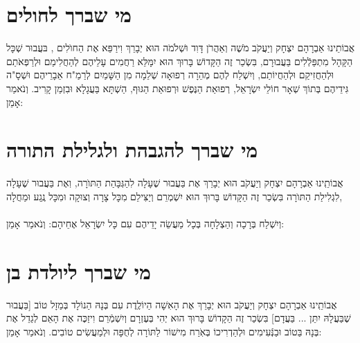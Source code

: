 \documentclass[a4paper, twoside, openany, parskip=half, 12pt]{article}
\begin{document}
\section*{מי שברך לחולים}
 אֲבוֹתֵינוּ אַבְרָהָם יִצְחָק וְיַעֲקֹב מֹשֶׁה וְאַהֲרֹן דָּוִד וּשְׁלֹמֹה הוּא יְבָרֵךְ וִירַפֵּא אֶת הַחוׂלִים 
,
בּעֲבוּר שְׁכָּל הַקָּהָל מִתְפַּלְֿלִים בַּעֲבוּרָם,  בִּשְׂכַר זֶה
 הַקָּדוֹשׁ בָּרוּךְ הוּא יִמָּלֵּא רַחֲמִים עָלֵיהֶם לְהַחֲלִימַם וּלְרַפְּאֹתַם וּלְהַחֲזִיקַם וּלְהַחֲיוֹתַם, וְיִשְׁלַח לְהֶם מְהֵרָה רְפוּאָה שְׁלֵמָה מִן הַשָּׁמַיִם לְרַמַ"ח אֵבָרֵיהֶם וּשְׁסָ"ה גִּידֵיהֶם בְּתוֹךְ שְׁאָר חוֹלֵי יִשְׂרָאֵל, רְפוּאַת הַנֶּפֶשׁ וּרְפוּאַת הַגּוּף,
  הַשְׁתָּא בַּעֲגָלָא וּבִזְמַן קָרִיב. וְנֹאמַר אָמֵן:\\

\section*{מי שברך להגבהת ולגלילת התורה}
 אֲבוֹתֵֽינוּ אַבְרָהָם יִצְחָק וְיַעֲקֹב הוּא יְבָרֵךְ אֶת 
  בַּעֲבוּר שֶׁעָלָה לִהַגְּבָּהַת הַתּוׂרָה, וֽאֶת 
   בַּעֲבוּר שֶׁעָלָה לִגְלִילַת הַתּוׂרָה
 בִּשְׂכַר זֶה הַקָּדוֹשׁ בָּרוּךְ הוּא יִשְׁמְרֵם וְיַצִּילֵם מִכָּל צָרָה וְצוּקָה וּמִכָּל נֶֽגַע וּמַחֲלָה,\\
 \\
וְיִשְׁלַח בְּרָכָה וְהַצְלָחָה בְּכָל מַעֲשֵׂה יָדֵיהֶם
    עִם כָּל יִשְׂרָאֵל אֶחֵיהָם: וְנֹאמַר אָמֵן:


\section*{מי שברך ליולדת בן}
אֲבוֹתֵֽינוּ אַבְרָהָם יִצְחָק וְיַעֲקֹב הוּא יְבָרֵךְ אֶת הָאִשָׁה הַיוֹלֶֽדֶת 
 עִם בְּנָהּ הַנוֹלָד בְּמַזָל טוֹב [בַּעֲבוּר שֶׁבַּעֲלָהּ יִתֵּן ... בַּעֲדָם] בִּשְׂכַר זֶה הַקָדוֹשׁ בָּרוּךְ הוּא יְהִי בְּעֶזְרָם וְיִשְׁמְֿרֵם וִיזַכֶּה אֶת הָאֵם לְגַדֵל אֶת בְּנָהּ בַּטוֹב וּבַנְּֿעִימִים וּלְהַדְרִיכוֹ בְּאֹֽרַח מִישׁוֹר לַתּוֹרָה לְחֻפָּה וּלְמַעֲשִׂים טוֹבִים. וְנֹאמַר אָמֵן:\\
\end{document}
